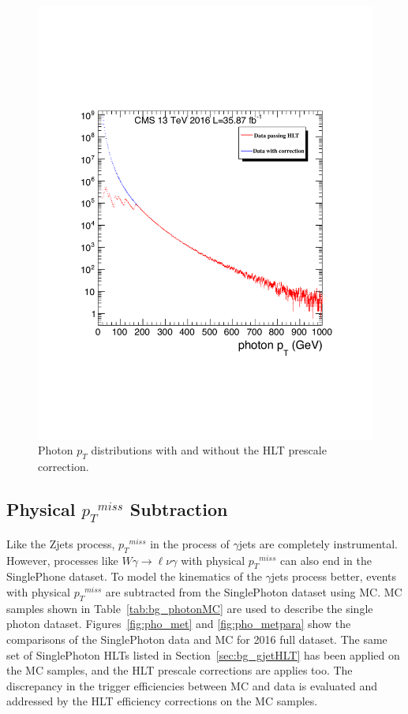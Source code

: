 \begin{figure}[htbp]
\begin{center}
\includegraphics[width=0.86\linewidth]{figures/bg_photonHLT_reweight.pdf}
\caption{Photon $p_T$ distributions with and without the HLT prescale correction. }
\label{fig:photon_pt_prescale}
\end{center}
\end{figure}

\subsection{Physical ${p_{T}}^{miss}$ Subtraction}\label{sec:bg_gjetphysmet}
Like the Zjets process,  ${p_{T}}^{miss}$ in the process of $\gamma$jets are completely instrumental. However, processes like $W\gamma\rightarrow\ell\nu\gamma$ with physical ${p_{T}}^{miss}$ can also end in the SinglePhone dataset. To model the kinematics of the $\gamma$jets process better, events with physical ${p_{T}}^{miss}$ are subtracted from the SinglePhoton dataset using MC. MC samples shown in Table~\ref{tab:bg_photonMC} are used to describe the single photon dataset. Figures~\ref{fig:pho_met} and \ref{fig:pho_metpara} show the comparisons of the SinglePhoton data and MC for 2016 full dataset. The same set of SinglePhoton HLTs listed in Section~\ref{sec:bg_gjetHLT} has been applied on the MC samples, and the HLT prescale corrections are applies too. The discrepancy in the trigger efficiencies between MC and data is evaluated and addressed by the HLT efficiency corrections on the MC samples.


